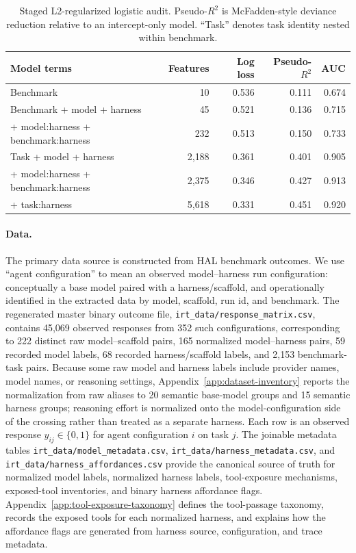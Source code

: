 \documentclass{article}
\begin{document}
\begin{table}[!htbp]
\centering
\small
\begin{tabular}{lrrrr}
\toprule
Model terms & Features & Log loss & Pseudo-$R^2$ & AUC \\
\midrule
Benchmark & 10 & 0.536 & 0.111 & 0.674 \\
Benchmark + model + harness & 45 & 0.521 & 0.136 & 0.715 \\
+ model:harness + benchmark:harness & 232 & 0.513 & 0.150 & 0.733 \\
Task + model + harness & 2{,}188 & 0.361 & 0.401 & 0.905 \\
+ model:harness + benchmark:harness & 2{,}375 & 0.346 & 0.427 & 0.913 \\
+ task:harness & 5{,}618 & 0.331 & 0.451 & 0.920 \\
\bottomrule
\end{tabular}
\caption{Staged L2-regularized logistic audit. Pseudo-$R^2$ is McFadden-style deviance reduction relative to an intercept-only model. ``Task'' denotes task identity nested within benchmark.}
\label{tab:gstudy}
\end{table}

\paragraph{Data.}
The primary data source is constructed from HAL benchmark outcomes. We use ``agent configuration'' to mean an observed model--harness run configuration: conceptually a base model paired with a harness/scaffold, and operationally identified in the extracted data by model, scaffold, run id, and benchmark. The regenerated master binary outcome file, \texttt{irt\_data/response\_matrix.csv}, contains 45{,}069 observed responses from 352 such configurations, corresponding to 222 distinct raw model--scaffold pairs, 165 normalized model--harness pairs, 59 recorded model labels, 68 recorded harness/scaffold labels, and 2{,}153 benchmark-task pairs. Because some raw model and harness labels include provider names, model names, or reasoning settings, Appendix~\ref{app:dataset-inventory} reports the normalization from raw aliases to 20 semantic base-model groups and 15 semantic harness groups; reasoning effort is normalized onto the model-configuration side of the crossing rather than treated as a separate harness. Each row is an observed response $y_{ij} \in \{0,1\}$ for agent configuration $i$ on task $j$. The joinable metadata tables \texttt{irt\_data/model\_metadata.csv}, \texttt{irt\_data/harness\_metadata.csv}, and \texttt{irt\_data/harness\_affordances.csv} provide the canonical source of truth for normalized model labels, normalized harness labels, tool-exposure mechanisms, exposed-tool inventories, and binary harness affordance flags. Appendix~\ref{app:tool-exposure-taxonomy} defines the tool-passage taxonomy, records the exposed tools for each normalized harness, and explains how the affordance flags are generated from harness source, configuration, and trace metadata.
\end{document}

